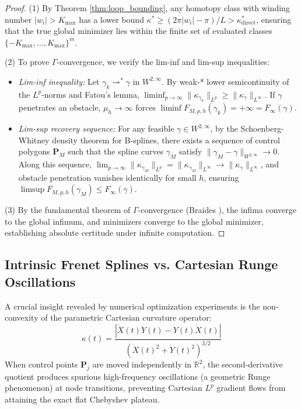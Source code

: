 \documentclass[11pt,reqno]{amsart}
\theoremstyle{definition}
\providecommand{\R}{\mathbb{R}}
\numberwithin{equation}{section}
\providecommand{\R}{\mathbb{R}}
\begin{document}
\begin{proof}
(1) By Theorem \ref{thm:loop_bounding}, any homotopy class with winding number $|w_i| > K_{\max}$ has a lower bound $\kappa^* \ge (2\pi |w_i| - \pi)/L > \kappa^*_{\mathrm{direct}}$, ensuring that the true global minimizer lies within the finite set of evaluated classes $\{-K_{\max}, \dots, K_{\max}\}^m$.

(2) To prove $\Gamma$-convergence, we verify the lim-inf and lim-sup inequalities:
\begin{itemize}
    \item \emph{Lim-inf inequality:} Let $\gamma_k \rightharpoonup^* \gamma$ in $W^{2,\infty}$. By weak-* lower semicontinuity of the $L^p$-norms and Fatou's lemma, $\liminf_{p \to \infty} \|\kappa_{\gamma_k}\|_{L^p} \ge \|\kappa_\gamma\|_{L^\infty}$. If $\gamma$ penetrates an obstacle, $\mu_h \to \infty$ forces $\liminf F_{M, p, h}(\gamma_k) = +\infty = F_\infty(\gamma)$.
    \item \emph{Lim-sup recovery sequence:} For any feasible $\gamma \in W^{2,\infty}$, by the Schoenberg-Whitney density theorem for B-splines, there exists a sequence of control polygons $\mathbf{P}_M$ such that the spline curves $\gamma_M$ satisfy $\|\gamma_M - \gamma\|_{W^{2,\infty}} \to 0$. Along this sequence, $\lim_{p \to \infty} \|\kappa_{\gamma_M}\|_{L^p} = \|\kappa_{\gamma_M}\|_{L^\infty} \to \|\kappa_\gamma\|_{L^\infty}$, and obstacle penetration vanishes identically for small $h$, ensuring $\limsup F_{M, p, h}(\gamma_M) \le F_\infty(\gamma)$.
\end{itemize}

(3) By the fundamental theorem of $\Gamma$-convergence (Braides \cite{braides2002}), the infima converge to the global infimum, and minimizers converge to the global minimizer, establishing absolute certitude under infinite computation.
\end{proof}

\subsection{Intrinsic Frenet Splines vs. Cartesian Runge Oscillations}
\label{subsec:frenet_vs_cartesian}
A crucial insight revealed by numerical optimization experiments is the non-convexity of the parametric Cartesian curvature operator:
\begin{equation}
\kappa(t) = \frac{|\dot{X}(t)\ddot{Y}(t) - \dot{Y}(t)\ddot{X}(t)|}{\left(\dot{X}(t)^2 + \dot{Y}(t)^2\right)^{3/2}}
\end{equation}
When control points $\mathbf{P}_j$ are moved independently in $\R^2$, the second-derivative quotient produces spurious high-frequency oscillations (a geometric Runge phenomenon) at node transitions, preventing Cartesian $L^p$ gradient flows from attaining the exact flat Chebyshev plateau.
\end{document}
